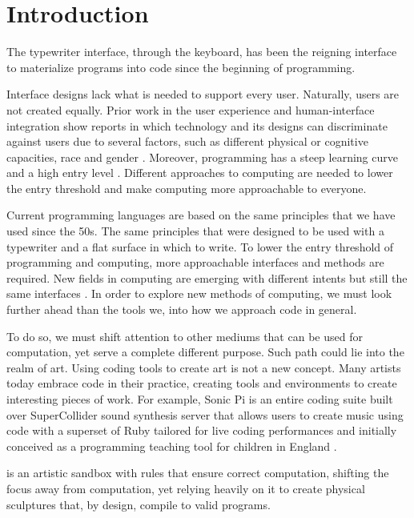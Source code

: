 
\chapter{Introduction}
\label{cha:introduction}
The typewriter interface, through the keyboard, has been the reigning interface to materialize programs into code since the beginning of programming.

Interface designs lack what is needed to support every user. Naturally, users are not created equally.
Prior work in the user experience and human-interface integration show reports in which technology and its designs can discriminate against users due to several factors,
such as different physical or cognitive capacities, race and gender \cite{ko23}.
Moreover, programming has a steep learning curve and a high entry level \cite{bosse17}.
Different approaches to computing are needed to lower the entry threshold and make computing more approachable to everyone.

Current programming languages are based on the same principles that we have used since the 50s.
The same principles that were designed to be used with a typewriter and a flat surface in which to write.
To lower the entry threshold of programming and computing, more approachable interfaces and methods are required.
New fields in computing are emerging with different intents but still the same interfaces \cite{hongji16}.
In order to explore new methods of computing, we must look further ahead than the tools we, into how we approach code in general.

To do so, we must shift attention to other mediums that can be used for computation, yet serve a complete different purpose.
Such path could lie into the realm of art. Using coding tools to create art is not a new concept.
Many artists today embrace code in their practice, creating tools and environments to create interesting pieces of work. 
For example, Sonic Pi is an entire coding suite built over SuperCollider sound synthesis server that allows users to create music using code with a superset of Ruby 
tailored for live coding performances and initially conceived as a programming teaching tool for children in England \cite{aaron16}.

\sculpt is an artistic sandbox with rules that ensure correct computation, shifting the focus away from computation, yet relying heavily on it to create physical sculptures that, by design, compile to valid programs.

\endinput